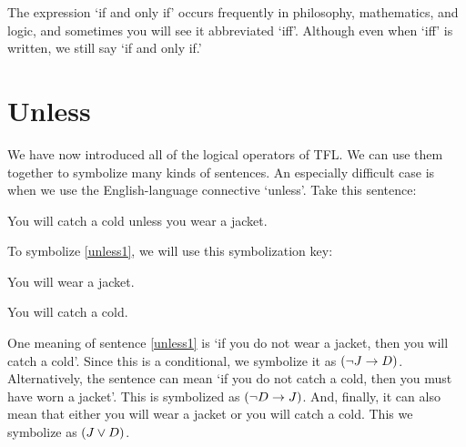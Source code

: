 The expression `if and only if' occurs frequently in philosophy, mathematics, and logic, and sometimes you will see it abbreviated `iff'. Although even when `iff' is written, we still say `if and only if.' 


	

\section{Unless}\label{s:unless}
We have now introduced all of the logical operators of TFL. We can use them together to symbolize many kinds of sentences. An especially difficult case is when we use the English-language connective `unless'. Take this sentence:

\begin{earg}
\item[\ex{unless1}] You will catch a cold unless you wear a jacket. 
\end{earg}
To symbolize \ref{unless1}, we will use this symbolization key:
	\begin{ekey}
		\item[J] You will wear a jacket.
		\item[D] You will catch a cold.
	\end{ekey}

One meaning of sentence \ref{unless1} is `if you do not wear a jacket, then you will catch a cold'. Since this is a conditional, we symbolize it as $({\neg} J \rightarrow D)$. Alternatively, the sentence can mean `if you do not catch a cold, then you must have worn a jacket'. This is symbolized as $({\neg} D \rightarrow J)$. And, finally, it can also mean that either you will wear a jacket or you will catch a cold. This we symbolize as $(J \vee D)$.

